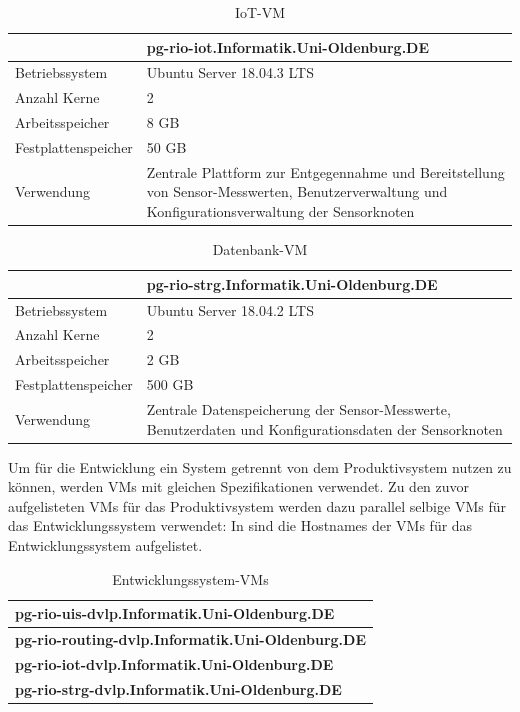 \begin{table}[H]\caption{IoT-VM}\label{tbl:vmiot}
\begin{tabularx}{\textwidth}{|l|X|}
	\hline
	&  \textbf{pg-rio-iot.Informatik.Uni-Oldenburg.DE}\\ 
	\hline Betriebssystem
	&  Ubuntu Server 18.04.3 LTS\\ 
	\hline Anzahl Kerne
	&  2\\ 
	\hline Arbeitsspeicher 
	&  8 GB\\ 
	\hline Festplattenspeicher
	&  50 GB\\ 
	\hline Verwendung 
	&  Zentrale Plattform zur Entgegennahme und Bereitstellung von Sensor-Messwerten, Benutzerverwaltung und Konfigurationsverwaltung der Sensorknoten\\ 
	\hline 
\end{tabularx}
\end{table}
\par\bigskip

\begin{table}[H]\caption{Datenbank-VM}\label{tbl:vmdb}
\begin{tabularx}{\textwidth}{|l|X|}
	\hline
	&  \textbf{pg-rio-strg.Informatik.Uni-Oldenburg.DE}\\ 
	\hline Betriebssystem
	&  Ubuntu Server 18.04.2 LTS\\ 
	\hline Anzahl Kerne
	&  2\\ 
	\hline Arbeitsspeicher 
	&  2 GB\\ 
	\hline Festplattenspeicher
	&  500 GB\\ 
	\hline Verwendung 
	&  Zentrale Datenspeicherung der Sensor-Messwerte, Benutzerdaten und Konfigurationsdaten der Sensorknoten\\ 
	\hline 
\end{tabularx}
\end{table}
\par\bigskip 

Um für die Entwicklung ein System getrennt von dem Produktivsystem nutzen zu können, werden VMs mit gleichen Spezifikationen verwendet.
Zu den zuvor aufgelisteten VMs für das Produktivsystem werden dazu parallel selbige VMs für das Entwicklungssystem verwendet:
In  sind die Hostnames der VMs für das Entwicklungssystem aufgelistet.\par\bigskip
\begin{table}[H]\caption{Entwicklungssystem-VMs}\label{tbl:vmsdev}
\begin{tabularx}{\textwidth}{|X|}
	\hline  \textbf{pg-rio-uis-dvlp.Informatik.Uni-Oldenburg.DE}\\
	\hline  \textbf{pg-rio-routing-dvlp.Informatik.Uni-Oldenburg.DE}\\
	\hline  \textbf{pg-rio-iot-dvlp.Informatik.Uni-Oldenburg.DE}\\
	\hline  \textbf{pg-rio-strg-dvlp.Informatik.Uni-Oldenburg.DE}\\
	\hline
\end{tabularx}
\end{table}
\par\bigskip

